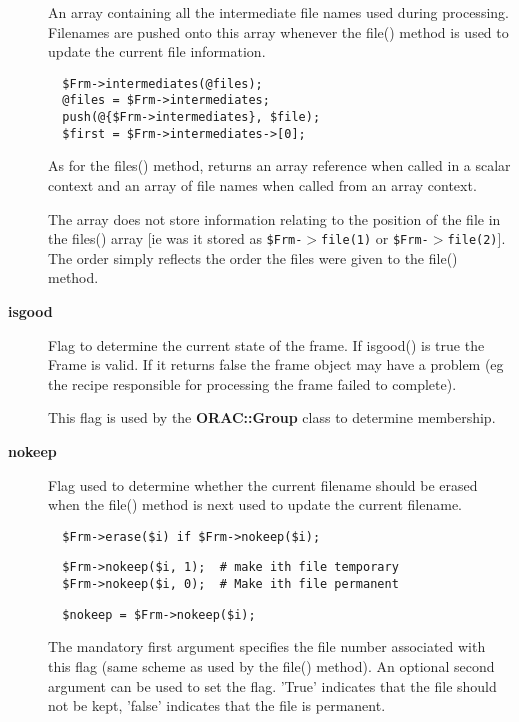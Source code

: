 \begin{description}
An array containing all the intermediate file names used
during processing. Filenames are pushed onto this array
whenever the file() method is used to update the current
file information.

\begin{verbatim}
  $Frm->intermediates(@files);
  @files = $Frm->intermediates;
  push(@{$Frm->intermediates}, $file);
  $first = $Frm->intermediates->[0];
\end{verbatim}


As for the files() method, returns an array reference when
called in a scalar context and an array of file names when
called from an array context.



The array does not store information relating to the position of the
file in the files() array [ie was it stored as \texttt{\$Frm-$>$file(1)} or
\texttt{\$Frm-$>$file(2)}]. The order simply reflects the order the files
were given to the file() method.


\item[\textbf{isgood}] \mbox{}

Flag to determine the current state of the frame. If isgood()
is true the Frame is valid. If it returns false the frame
object may have a problem (eg the recipe responsible for 
processing the frame failed to complete).



This flag is used by the \textbf{ORAC::Group} class to determine
membership.


\item[\textbf{nokeep}] \mbox{}

Flag used to determine whether the current filename should be
erased when the file() method is next used to update the current
filename.

\begin{verbatim}
  $Frm->erase($i) if $Frm->nokeep($i);
\end{verbatim}
\begin{verbatim}
  $Frm->nokeep($i, 1);  # make ith file temporary
  $Frm->nokeep($i, 0);  # Make ith file permanent
\end{verbatim}
\begin{verbatim}
  $nokeep = $Frm->nokeep($i);
\end{verbatim}


The mandatory first argument specifies the file number associated with
this flag (same scheme as used by the file() method). An optional
second argument can be used to set the flag. 'True' indicates that the
file should not be kept, 'false' indicates that the file is permanent.



\end{description}
